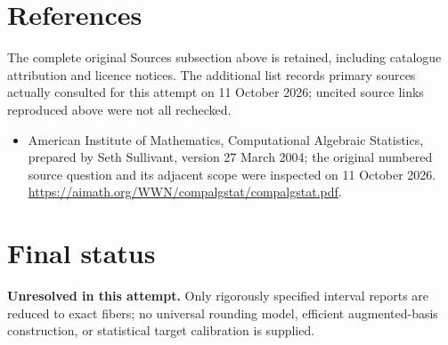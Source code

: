 \documentclass[11pt]{article}
\begin{document}
\section{References}
The complete original Sources subsection above is retained, including catalogue attribution and licence notices. The additional list records primary sources actually consulted for this attempt on 11 October 2026; uncited source links reproduced above were not all rechecked.
\begin{itemize}
\item American Institute of Mathematics, Computational Algebraic Statistics, prepared by Seth Sullivant, version 27 March 2004; the original numbered source question and its adjacent scope were inspected on 11 October 2026. \url{https://aimath.org/WWN/compalgstat/compalgstat.pdf}.
\end{itemize}
\section{Final status}
\textbf{Unresolved in this attempt.} Only rigorously specified interval reports are reduced to exact fibers; no universal rounding model, efficient augmented-basis construction, or statistical target calibration is supplied.
\end{document}
